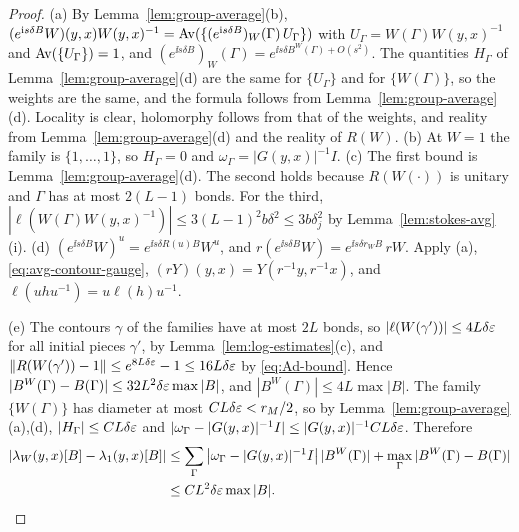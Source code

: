 \begin{proof}
(a) By Lemma~\ref{lem:group-average}(b), $(e^{\mathrm i s\delta B}W)(y,x)W(y,x)^{-1}=\operatorname{Av}(\{(e^{\mathrm i s\delta B})_W(\Gamma)\,U_\Gamma\})$ with $U_\Gamma=W(\Gamma)W(y,x)^{-1}$ and $\operatorname{Av}(\{U_\Gamma\})=1$, and $(e^{\ii s\delta B})_W(\Gamma)=e^{\ii s\delta B^W(\Gamma)+O(s^2)}$. The quantities $H_\Gamma$ of Lemma~\ref{lem:group-average}(d) are the same for $\{U_\Gamma\}$ and for $\{W(\Gamma)\}$, so the weights are the same, and the formula follows from Lemma~\ref{lem:group-average}(d). Locality is clear, holomorphy follows from that of the weights, and reality from Lemma~\ref{lem:group-average}(d) and the reality of $R(W)$. (b) At $W=1$ the family is $\{1,\dots,1\}$, so $H_\Gamma=0$ and $\omega_\Gamma=|G(y,x)|^{-1}I$. (c) The first bound is Lemma~\ref{lem:group-average}(d). The second holds because $R(W(\cdot))$ is unitary and $\Gamma$ has at most $2(L-1)$ bonds. For the third, $|\ell(W(\Gamma)W(y,x)^{-1})|\le3(L-1)^2b\delta^2\le3b\delta_j^2$ by Lemma~\ref{lem:stokes-avg}(i). (d) $(e^{\ii s\delta B}W)^u=e^{\ii s\delta R(u)B}W^u$, and $r(e^{\ii s\delta B}W)=e^{\ii s\delta r_WB}\,rW$. Apply (a), \eqref{eq:avg-contour-gauge}, $(rY)(y,x)=Y(r^{-1}y,r^{-1}x)$, and $\ell(uhu^{-1})=u\ell(h)u^{-1}$.

(e) The contours $\gamma$ of the families have at most $2L$ bonds, so $|\ell(W(\gamma'))|\le4L\delta\varepsilon$ for all initial pieces $\gamma'$, by Lemma~\ref{lem:log-estimates}(c), and $\|R(W(\gamma'))-1\|\le e^{8L\delta\varepsilon}-1\le16L\delta\varepsilon$ by \eqref{eq:Ad-bound}. Hence $|B^W(\Gamma)-B(\Gamma)|\le32L^2\delta\varepsilon\max|B|$, and $|B^W(\Gamma)|\le4L\max|B|$. The family $\{W(\Gamma)\}$ has diameter at most $C L\delta\varepsilon<r_M/2$, so by Lemma~\ref{lem:group-average}(a),(d), $|H_\Gamma|\le CL\delta\varepsilon$ and $|\omega_\Gamma-|G(y,x)|^{-1}I|\le|G(y,x)|^{-1}CL\delta\varepsilon$. Therefore
\[
\begin{aligned}
|\lambda_W(y,x)[B]-\lambda_1(y,x)[B]|&\le\sum_\Gamma\big|\omega_\Gamma-|G(y,x)|^{-1}I\big|\,|B^W(\Gamma)|+\max_\Gamma|B^W(\Gamma)-B(\Gamma)|\\
&\le CL^2\delta\varepsilon\max|B| .
\end{aligned}
\]


\end{proof}
